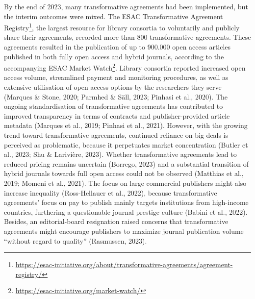 \documentclass[a4paper,man,floatsintext,longtable,noextraspace,12pt]{apa6}
\begin{document}
By the end of 2023, many transformative agreements had been implemented,
but the interim outcomes were mixed. The ESAC Transformative Agreement
Registry\footnote{\url{https://esac-initiative.org/about/transformative-agreements/agreement-registry/}},
the largest resource for library consortia to voluntarily and publicly
share their agreements, recorded more than 800 transformative
agreements. These agreements resulted in the publication of up to
900.000 open access articles published in both fully open access and
hybrid journals, according to the accompanying ESAC Market
Watch\footnote{\url{https://esac-initiative.org/market-watch/}}. Library
consortia reported increased open access volume, streamlined payment and
monitoring procedures, as well as extensive utilisation of open access
options by the researchers they serve (Marques \& Stone, 2020; Parmhed
\& Säll, 2023; Pinhasi et al., 2020). The ongoing standardisation of
transformative agreements has contributed to improved transparency in
terms of contracts and publisher-provided article metadata (Marques et
al., 2019; Pinhasi et al., 2021). However, with the growing trend toward
transformative agreements, continued reliance on big deals is perceived
as problematic, because it perpetuates market concentration (Butler et
al., 2023; Shu \& Larivière, 2023). Whether transformative agreements
lead to reduced pricing remains uncertain (Borrego, 2023) and a
substantial transition of hybrid journals towards full open access could
not be observed (Matthias et al., 2019; Momeni et al., 2021). The focus
on large commercial publishers might also increase inequality
(Ross-Hellauer et al., 2022), because transformative agreements' focus
on pay to publish mainly targets institutions from high-income
countries, furthering a questionable journal prestige culture (Babini et
al., 2022). Besides, an editorial-board resignation raised concerns that
transformative agreements might encourage publishers to maximize journal
publication volume ``without regard to quality'' (Rasmussen, 2023).
\end{document}
